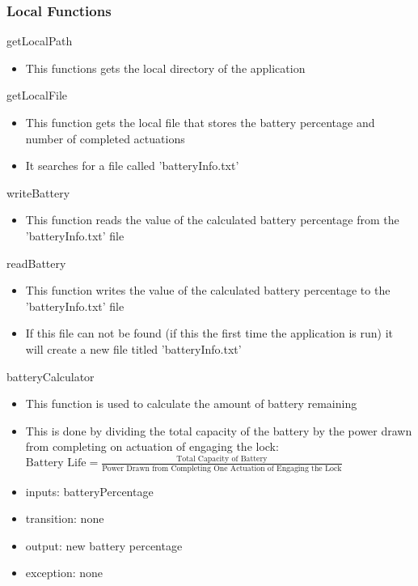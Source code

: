 \documentclass[12pt, titlepage]{article}
\begin{document}
\subsubsection{Local Functions}

\noindent getLocalPath
\begin{itemize}
\item This functions gets the local directory of the application
\end{itemize}

\noindent getLocalFile
\begin{itemize}
\item This function gets the local file that stores the battery percentage and number of completed actuations 
\item It searches for a file called 'batteryInfo.txt'
\end{itemize}

\noindent writeBattery
\begin{itemize}
\item This function reads the value of the calculated battery percentage from the 'batteryInfo.txt' file
\end{itemize}

\noindent readBattery
\begin{itemize}
\item This function writes the value of the calculated battery percentage to the 'batteryInfo.txt' file
\item If this file can not be found (if this the first time the application is run) it will create a new file titled 'batteryInfo.txt'
\end{itemize}

\noindent batteryCalculator
\begin{itemize}
\item This function is used to calculate the amount of battery remaining
\item This is done by dividing the total capacity of the battery by the power drawn from completing on actuation of engaging the lock: \newline $\text{Battery Life} = \frac{\text{Total Capacity of Battery}}{\text{Power Drawn from Completing One Actuation of Engaging the Lock}}$
\end{itemize}

\begin{itemize}
\item inputs: batteryPercentage
\item transition: none
\item output: new battery percentage
\item exception: none
\end{itemize}
\end{document}
